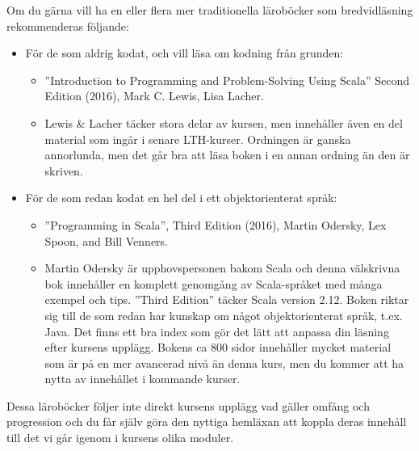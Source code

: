 Om du gärna vill ha en eller flera mer traditionella läroböcker som bredvidläsning rekommenderas följande:
\begin{itemize}[noitemsep, leftmargin=*]
\item För de som aldrig kodat, och vill läsa om kodning från grunden:
\begin{itemize}[nolistsep]
\item ''Introduction to Programming and Problem-Solving Using Scala'' Second Edition (2016), Mark C. Lewis, Lisa Lacher.  %

\item Lewis \& Lacher täcker stora delar av kursen, men innehåller även en del material som ingår i senare LTH-kurser. Ordningen är ganska annorlunda, men det går bra att läsa boken i en annan ordning än den är skriven.
\end{itemize}
\item För de som redan kodat en hel del i ett objektorienterat språk:
\begin{itemize}[nolistsep, noitemsep]
\item ''Programming in Scala'', Third Edition (2016), Martin Odersky, Lex Spoon, and Bill Venners.  %
  \item Martin Odersky är upphovspersonen bakom Scala och denna välskrivna bok innehåller en komplett genomgång av Scala-språket med många exempel och tips. ''Third Edition'' täcker Scala version 2.12. Boken riktar sig till de som redan har kunskap om något objektorienterat språk, t.ex. Java. Det finns ett bra index som gör det lätt att anpassa din läsning efter kursens upplägg. Bokens ca 800 sidor innehåller mycket material som är på en mer avancerad nivå än denna kurs, men du kommer att ha nytta av innehållet i kommande kurser.
\end{itemize}
\end{itemize}
Dessa läroböcker följer inte direkt kursens upplägg vad gäller omfång och progression och du får själv göra den nyttiga hemläxan att koppla  deras innehåll till det vi går igenom i kursens olika moduler.

